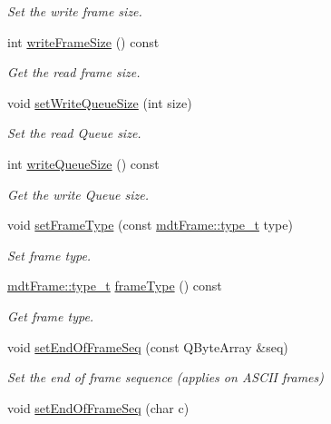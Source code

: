 \begin{DoxyCompactItemize}
\begin{DoxyCompactList}\small\item\em Set the write frame size. \end{DoxyCompactList}\item 
int \hyperlink{classmdt_port_config_a19bda9f9ce29657179994e02c6da11b9}{write\-Frame\-Size} () const 
\begin{DoxyCompactList}\small\item\em Get the read frame size. \end{DoxyCompactList}\item 
void \hyperlink{classmdt_port_config_a8a99771f7acfeb546d1d89d3671407e5}{set\-Write\-Queue\-Size} (int size)
\begin{DoxyCompactList}\small\item\em Set the read Queue size. \end{DoxyCompactList}\item 
int \hyperlink{classmdt_port_config_a93d72b1ea53f188d7a35bc044394b959}{write\-Queue\-Size} () const 
\begin{DoxyCompactList}\small\item\em Get the write Queue size. \end{DoxyCompactList}\item 
void \hyperlink{classmdt_port_config_a627adcb87d26757238f844db19fc248d}{set\-Frame\-Type} (const \hyperlink{classmdt_frame_af936e37d5fe4c066c0fb0161fafd4a17}{mdt\-Frame\-::type\-\_\-t} type)
\begin{DoxyCompactList}\small\item\em Set frame type. \end{DoxyCompactList}\item 
\hyperlink{classmdt_frame_af936e37d5fe4c066c0fb0161fafd4a17}{mdt\-Frame\-::type\-\_\-t} \hyperlink{classmdt_port_config_af9c95090820c449412298832582a0fab}{frame\-Type} () const 
\begin{DoxyCompactList}\small\item\em Get frame type. \end{DoxyCompactList}\item 
void \hyperlink{classmdt_port_config_a3c5e1c444a18da7d68430bd1c14030f4}{set\-End\-Of\-Frame\-Seq} (const Q\-Byte\-Array \&seq)
\begin{DoxyCompactList}\small\item\em Set the end of frame sequence (applies on A\-S\-C\-I\-I frames) \end{DoxyCompactList}\item 
void \hyperlink{classmdt_port_config_a9c67e95bb660a13313ec03e07a924793}{set\-End\-Of\-Frame\-Seq} (char c)

\end{DoxyCompactItemize}
